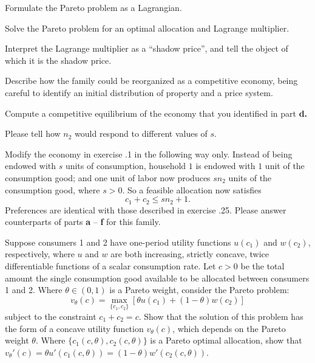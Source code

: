 \medskip

 Formulate the Pareto problem as a Lagrangian.

\medskip
{} Solve the Pareto problem for an optimal allocation and Lagrange multiplier.

\medskip
{}  Interpret  the Lagrange multiplier as a ``shadow price'', and tell the object of which it is the shadow price.

\medskip
{} Describe how the family could be reorganized as a competitive economy, being careful to identify an initial distribution of
property and a price system.

\medskip

 Compute a competitive equilibrium of the economy that you identified in part {\bf d.}

\medskip
{} Please tell how $n_2$ would respond to different values of $s$.

\medskip

 
\medskip
\noindent Modify the economy in exercise \the\chapternum.1 in the following way only.  Instead of being endowed with $s$ units of consumption, household
$1$ is endowed with $1$ unit of the consumption good; and one unit of labor now produces $s n_2$ units of the consumption good, where $s >0$.  So a feasible
allocation now satisfies
$$ c_1 + c_2 \leq s n_2 + 1 .$$
Preferences are identical with those described in exercise  \the\chapternum.25.  Please answer counterparts of parts {\bf a} -- {\bf f} for this family.


\medskip

\medskip
\noindent Suppose consumers 1 and 2 have one-period utility
functions $u(c_1)$ and $w(c_2)$, respectively, where $u$ and $w$
are both increasing, strictly concave, twice differentiable
functions of a scalar consumption rate. Let $c > 0$ be the total amount the single consumption good available to be allocated
between consumers 1 and 2. Where $\theta \in (0,1)$ is a Pareto weight, consider the Pareto
problem:
 $$v_\theta(c) = \max_{\{c_1, c_2\}} \left[ \theta u(c_1)
   + (1-\theta) w(c_2) \right]$$ subject to
the constraint $c_1 + c_2 = c$.  Show that the solution of this
problem has the form of a concave utility function $v_\theta(c)$,
which depends on the Pareto weight $\theta$. Where $\{c_1(c,\theta), c_2(c,\theta)\}$ is a Pareto optimal allocation,
show that
$v_\theta'(c) = \theta u'(c_1(c,\theta)) = (1-\theta) w'(c_2(c,\theta))$.

